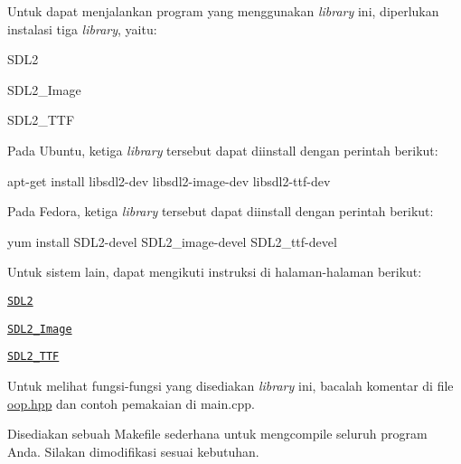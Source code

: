 Untuk dapat menjalankan program yang menggunakan {\itshape library} ini, diperlukan instalasi tiga {\itshape library}, yaitu\+:


\begin{DoxyItemize}
\item S\+D\+L2
\item S\+D\+L2\+\_\+\+Image
\item S\+D\+L2\+\_\+\+T\+TF
\end{DoxyItemize}

Pada Ubuntu, ketiga {\itshape library} tersebut dapat diinstall dengan perintah berikut\+: \begin{DoxyVerb}apt-get install libsdl2-dev libsdl2-image-dev libsdl2-ttf-dev
\end{DoxyVerb}


Pada Fedora, ketiga {\itshape library} tersebut dapat diinstall dengan perintah berikut\+: \begin{DoxyVerb}yum install SDL2-devel SDL2_image-devel SDL2_ttf-devel
\end{DoxyVerb}


Untuk sistem lain, dapat mengikuti instruksi di halaman-\/halaman berikut\+:
\begin{DoxyItemize}
\item \href{http://lazyfoo.net/tutorials/SDL/01_hello_SDL/index.php}{\tt S\+D\+L2}
\item \href{https://www.libsdl.org/projects/SDL_image/}{\tt S\+D\+L2\+\_\+\+Image}
\item \href{https://www.libsdl.org/projects/SDL_ttf/}{\tt S\+D\+L2\+\_\+\+T\+TF}
\end{DoxyItemize}

Untuk melihat fungsi-\/fungsi yang disediakan {\itshape library} ini, bacalah komentar di file {\ttfamily \mbox{\hyperlink{oop_8hpp}{oop.\+hpp}}} dan contoh pemakaian di {\ttfamily main.\+cpp}.

Disediakan sebuah Makefile sederhana untuk mengcompile seluruh program Anda. Silakan dimodifikasi sesuai kebutuhan. 